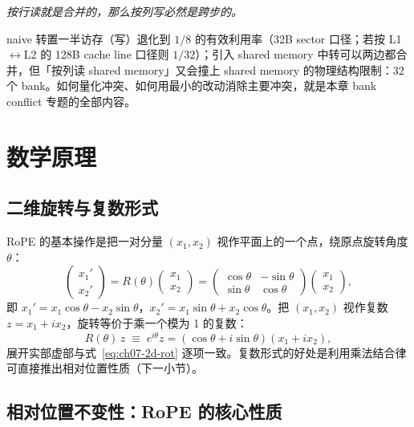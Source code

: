 \begin{center}
\textit{按行读就是合并的，那么按列写必然是跨步的。}
\end{center}

naive 转置一半访存（写）退化到 $1/8$ 的有效利用率（32B sector 口径；若按 L1$\leftrightarrow$L2 的 128B cache line 口径则 $1/32$）；引入 shared memory 中转可以两边都合并，但「按列读 shared memory」又会撞上 shared memory 的物理结构限制：32 个 bank。如何量化冲突、如何用最小的改动消除主要冲突，就是本章 bank conflict 专题的全部内容。

\section{数学原理}

\subsection{二维旋转与复数形式}

RoPE 的基本操作是把一对分量 $(x_1, x_2)$ 视作平面上的一个点，绕原点旋转角度 $\theta$：
\begin{equation}
  \begin{pmatrix} x_1' \\ x_2' \end{pmatrix}
  = R(\theta)\begin{pmatrix} x_1 \\ x_2 \end{pmatrix}
  = \begin{pmatrix} \cos\theta & -\sin\theta \\ \sin\theta & \cos\theta \end{pmatrix}
  \begin{pmatrix} x_1 \\ x_2 \end{pmatrix},
  \label{eq:ch07-2d-rot}
\end{equation}
即 $x_1' = x_1\cos\theta - x_2\sin\theta$，$x_2' = x_1\sin\theta + x_2\cos\theta$。把 $(x_1,x_2)$ 视作复数 $z = x_1 + i x_2$，旋转等价于乘一个模为 1 的复数：
\begin{equation}
  R(\theta)\, z \;\equiv\; e^{i\theta} z = (\cos\theta + i\sin\theta)(x_1 + i x_2),
  \label{eq:ch07-complex}
\end{equation}
展开实部虚部与式~\eqref{eq:ch07-2d-rot} 逐项一致。复数形式的好处是利用乘法结合律可直接推出相对位置性质（下一小节）。

\subsection{相对位置不变性：RoPE 的核心性质}

